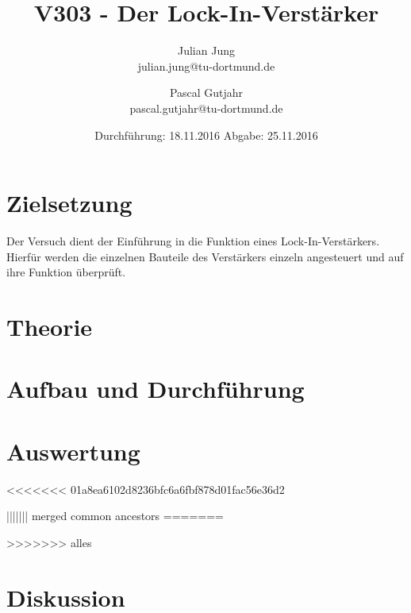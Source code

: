 

\title{V303 - Der Lock-In-Verstärker}
\author{Julian Jung \\ julian.jung@tu-dortmund.de
  \and Pascal Gutjahr \\ pascal.gutjahr@tu-dortmund.de}
  \date{Durchführung: 18.11.2016
  \hspace{3em}
  Abgabe: 25.11.2016}
  
\maketitle
\newpage
\tableofcontents
\newpage
\section{Zielsetzung}
Der Versuch dient der Einführung in die Funktion eines Lock-In-Verstärkers.
Hierfür werden die einzelnen Bauteile des Verstärkers einzeln angesteuert und
auf ihre Funktion überprüft.
\section{Theorie}

\section{Aufbau und Durchführung}

\section{Auswertung}
<<<<<<< 01a8ea6102d8236bfc6a6fbf878d01fac56e36d2

||||||| merged common ancestors
% 
=======

>>>>>>> alles
\section{Diskussion}
% 
\printbibliography %

